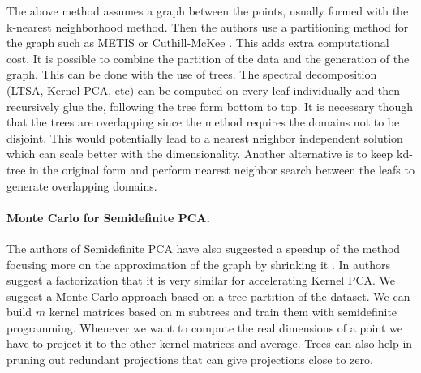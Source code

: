 \documentclass[12pt,letterpaper,doublespaced,ETD,dvips,proposal]{gtthesis}
\begin{document}
\begin{Body}

\vspace{1cm}

The above method assumes a graph between the points, usually formed with the k-nearest neighborhood
method. Then the authors use a partitioning method for the graph such as METIS \cite{karypis1995mug}
or Cuthill-McKee \cite{george1981csl}.
This adds extra computational cost. It is possible to combine the 
partition of the data and the generation of the graph. This can be done with the use of trees. 
The spectral decomposition (LTSA, Kernel PCA, etc) can be computed on every leaf individually 
and then recursively glue the, following the tree form bottom to top. It is necessary though that
the trees are overlapping since the method requires the domains not to be disjoint. This would potentially
lead to a nearest neighbor independent solution which can scale better with the dimensionality. 
Another alternative is to keep kd-tree in the original form and perform nearest 
neighbor search between the leafs to generate overlapping domains.

\paragraph{Monte Carlo for Semidefinite PCA.}
The authors of Semidefinite PCA have also suggested a speedup of the method focusing more on the
approximation of the graph by shrinking it \cite{weinberger2005ndr}. In \cite{scholkopf2002lks} 
authors suggest a factorization that it is very similar for accelerating Kernel PCA. We suggest a
Monte Carlo approach based on a tree partition of the dataset. We can build $m$ kernel matrices
based on m subtrees and train them with semidefinite programming. Whenever we want to compute the 
real dimensions of a point we have to project it to the other kernel matrices and average. Trees
can also help in pruning out redundant projections that can give projections close to zero.



\end{Body}
\end{document}
